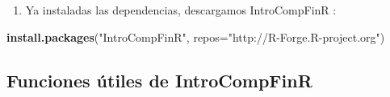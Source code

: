 \documentclass[12pt,]{book}
\newenvironment{Shaded}{\begin{snugshade}}{\end{snugshade}}
\newcommand{\KeywordTok}[1]{\textcolor[rgb]{0.13,0.29,0.53}{\textbf{#1}}}
\newcommand{\DataTypeTok}[1]{\textcolor[rgb]{0.13,0.29,0.53}{#1}}
\newcommand{\StringTok}[1]{\textcolor[rgb]{0.31,0.60,0.02}{#1}}
\newcommand{\NormalTok}[1]{#1}
\providecommand{\tightlist}{%
  \setlength{\itemsep}{0pt}\setlength{\parskip}{0pt}}
\begin{document}
\begin{enumerate}
\def\labelenumi{\arabic{enumi}.}
\setcounter{enumi}{1}
\tightlist
\item
  Ya instaladas las dependencias, descargamos IntroCompFinR :
\end{enumerate}

\begin{Shaded}
\begin{Highlighting}[]
\KeywordTok{install.packages}\NormalTok{(}\StringTok{"IntroCompFinR"}\NormalTok{, }\DataTypeTok{repos=}\StringTok{"http://R-Forge.R-project.org"}\NormalTok{)}
\end{Highlighting}
\end{Shaded}

\subsection{Funciones útiles de
IntroCompFinR}\label{funciones-utiles-de-introcompfinr}
\end{document}
